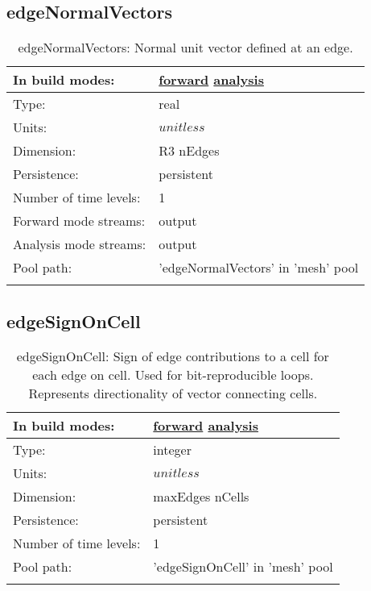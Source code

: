\subsection[edgeNormalVectors]{edgeNormalVectors}
\label{subsec:var_sec_mesh_edgeNormalVectors}
\begin{center}
\begin{longtable}{| p{2.0in} | p{4.0in} |}
        \hline 
        In build modes: & \hyperref[subsec:forward_var_tab_mesh]{forward} \hyperref[subsec:analysis_var_tab_mesh]{analysis} \\
        \hline 
        Type: & real \\
        \hline 
        Units: & $unitless$ \\
        \hline 
        Dimension: & R3 nEdges \\
        \hline 
        Persistence: & persistent \\
        \hline 
        Number of time levels: & 1 \\
        \hline 
		 Forward mode streams: &  output \\
        \hline 
		 Analysis mode streams: &  output \\
        \hline 
            Pool path: & 'edgeNormalVectors' in 'mesh' pool
 \\
		 \hline 
    \caption{edgeNormalVectors: Normal unit vector defined at an edge.}
\end{longtable}
\end{center}
\subsection[edgeSignOnCell]{edgeSignOnCell}
\label{subsec:var_sec_mesh_edgeSignOnCell}
\begin{center}
\begin{longtable}{| p{2.0in} | p{4.0in} |}
        \hline 
        In build modes: & \hyperref[subsec:forward_var_tab_mesh]{forward} \hyperref[subsec:analysis_var_tab_mesh]{analysis} \\
        \hline 
        Type: & integer \\
        \hline 
        Units: & $unitless$ \\
        \hline 
        Dimension: & maxEdges nCells \\
        \hline 
        Persistence: & persistent \\
        \hline 
        Number of time levels: & 1 \\
        \hline 
            Pool path: & 'edgeSignOnCell' in 'mesh' pool
 \\
		 \hline 
    \caption{edgeSignOnCell: Sign of edge contributions to a cell for each edge on cell. Used for bit-reproducible loops. Represents directionality of vector connecting cells.}
\end{longtable}
\end{center}
